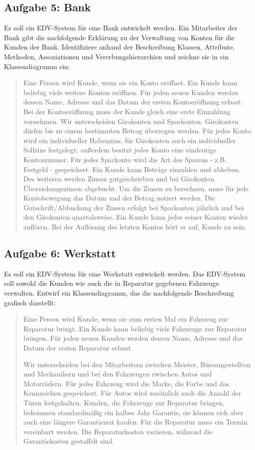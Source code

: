 \subsection{Aufgabe 5: Bank} 

Es soll ein EDV-System für eine Bank entwickelt werden. Ein Mitarbeiter der Bank
gibt die nachfolgende Erklärung zu der Verwaltung von Konten für die Kunden der
Bank. Identifiziere anhand der Beschreibung Klassen, Attribute, Methoden,
Assoziationen und Vererbungshierarchien und zeichne sie in ein Klassendiagramm
ein:

\begin{quotation}
\noindent Eine Person wird Kunde, wenn sie ein Konto eröffnet. Ein Kunde kann
beliebig viele weitere Konten eröffnen. Für jeden neuen Kunden werden dessen
Name, Adresse und das Datum der ersten Kontoeröffnung erfasst. Bei der
Kontoeröffnung muss der Kunde gleich eine erste Einzahlung vornehmen.
Wir unterscheiden Girokonten und Sparkonten. Girokonten dürfen bis zu einem
bestimmten Betrag überzogen werden. Für jedes Konto wird ein individueller
Habenzins, für Girokonten auch ein individueller Sollzins festgelegt; außerdem
besitzt jedes Konto eine eindeutige Kontonummer. Für jedes Sparkonto wird die
Art des Sparens - z.B. Festgeld - gespeichert. Ein Kunde kann Beträge einzahlen
und abheben. Des weiteren werden Zinsen gutgeschrieben und bei Girokonten
Überziehungszinsen abgebucht. Um die Zinsen zu berechnen, muss für jede
Kontobewegung das Datum und der Betrag notiert werden. Die Gutschrift/Abbuchung
der Zinsen erfolgt bei Sparkonten jährlich und bei den Girokonten
quartalsweise. Ein Kunde kann jedes seiner Konten wieder auflösen. Bei der
Auflösung des letzten Kontos hört er auf, Kunde zu sein.
\end{quotation}


\subsection{Aufgabe 6: Werkstatt}

Es soll ein EDV-System für eine Werkstatt entwickelt werden. Das EDV-System
soll sowohl die Kunden wie auch die in Reparatur gegebenen Fahrzeuge verwalten.
Entwirf ein Klassendiagramm, das die nachfolgende Beschreibung grafisch
darstellt:

\begin{quotation}
\noindent Eine Person wird Kunde, wenn sie zum ersten Mal ein Fahrzeug zur
Reparatur bringt. Ein Kunde kann beliebig viele Fahrzeuge zur Reparatur
bringen. Für jeden neuen Kunden werden dessen Name, Adresse und das Datum der
ersten Reparatur erfasst.

Wir unterscheiden bei den Mitarbeitern zwischen Meister, Büroangestellten und
Mechanikern und bei den Fahrzeugen zwischen Autos und Motorrädern. Für jedes
Fahrzeug wird die Marke, die Farbe und das Kennzeichen gespeichert. Für Autos
wird zusätzlich auch die Anzahl der Türen festgehalten. Kunden, die Fahrzeuge
zur Reparatur bringen, bekommen standardmäßig ein halbes Jahr Garantie, sie
können sich aber auch eine längere Garantiezeit kaufen. Für die Reparatur muss
ein Termin vereinbart werden. Die Reparaturkosten variieren, während die
Garantiekosten gestaffelt sind.
\end{quotation}
